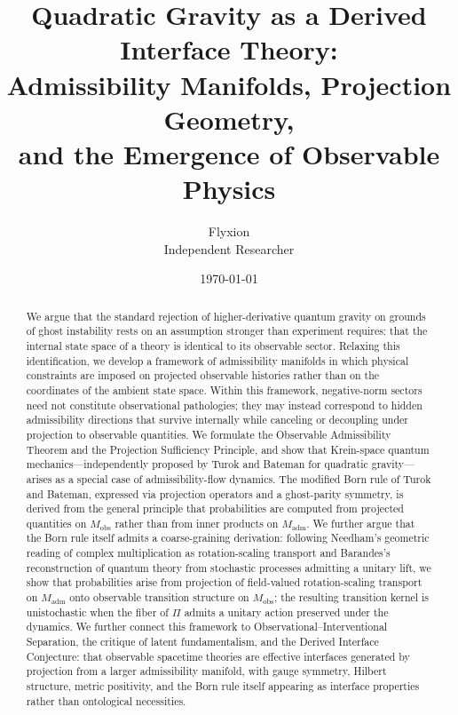 \documentclass[12pt,a4paper]{article}
\title{\textbf{Quadratic Gravity as a Derived Interface Theory:\\
Admissibility Manifolds, Projection Geometry,\\
and the Emergence of Observable Physics}}
\author{Flyxion\\[0.4em]
\small Independent Researcher}
\date{\today}
\theoremstyle{remark}
\begin{document}
\maketitle

\begin{abstract}
We argue that the standard rejection of higher-derivative quantum gravity
on grounds of ghost instability rests on an assumption stronger than
experiment requires: that the internal state space of a theory is
identical to its observable sector. Relaxing this identification, we
develop a framework of admissibility manifolds in which physical
constraints are imposed on projected observable histories rather than
on the coordinates of the ambient state space. Within this framework,
negative-norm sectors need not constitute observational pathologies; they
may instead correspond to hidden admissibility directions that survive
internally while canceling or decoupling under projection to observable
quantities. We formulate the Observable Admissibility Theorem and the
Projection Sufficiency Principle, and show that Krein-space quantum
mechanics---independently proposed by Turok and Bateman for quadratic
gravity---arises as a special case of admissibility-flow dynamics. The
modified Born rule of Turok and Bateman, expressed via projection operators
and a ghost-parity symmetry, is derived from the general principle that
probabilities are computed from projected quantities on $M_{\mathrm{obs}}$
rather than from inner products on $M_{\mathrm{adm}}$. We further argue
that the Born rule itself admits a coarse-graining derivation: following
Needham's geometric reading of complex multiplication as rotation-scaling
transport and Barandes's reconstruction of quantum theory from stochastic
processes admitting a unitary lift, we show that probabilities arise from
projection of field-valued rotation-scaling transport on $M_{\mathrm{adm}}$
onto observable transition structure on $M_{\mathrm{obs}}$; the resulting
transition kernel is unistochastic when the fiber of $\Pi$ admits a unitary
action preserved under the dynamics. We further connect this framework to
Observational--Interventional Separation, the critique of latent
fundamentalism, and the Derived Interface Conjecture: that observable
spacetime theories are effective interfaces generated by projection from a
larger admissibility manifold, with gauge symmetry, Hilbert structure,
metric positivity, and the Born rule itself appearing as interface
properties rather than ontological necessities.
\end{abstract}
\end{document}
